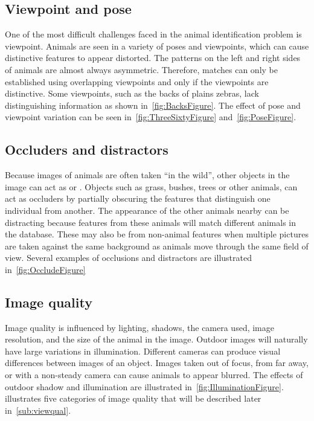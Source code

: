     \subsection{Viewpoint and pose}
        One of the most difficult challenges faced in the animal
          identification problem is viewpoint.
        Animals are seen in a variety of poses and viewpoints, which
          can cause distinctive features to appear distorted.
        The patterns on the left and right sides of animals are almost
          always asymmetric.
        Therefore, matches can only be established using overlapping
          viewpoints and only if the viewpoints are distinctive.
        Some viewpoints, such as the backs of plains zebras, lack
          distinguishing information as shown in~\cref{fig:BacksFigure}.
        The effect of pose and viewpoint variation can be seen
          in~\cref{fig:ThreeSixtyFigure} and~\cref{fig:PoseFigure}.

        \BacksFigure{}

        \ThreeSixtyFigure{}

        \PoseFigure{}

    \subsection{Occluders and distractors}
        Because images of animals are often taken ``in the wild'',
          other objects in the image can act as  or
          .
        Objects such as grass, bushes, trees or other animals, can act
          as occluders by partially obscuring the features that
          distinguish one individual from another.
        The appearance of the other animals nearby can be distracting
          because features from these animals will match different
          animals in the database.
        These  may also be from non-animal
          features when multiple pictures are taken against the same
          background as animals move through the same field of view.
        Several examples of occlusions and distractors are illustrated
          in~\cref{fig:OccludeFigure}

        \OccludeFigure{}

    \subsection{Image quality}
        Image quality is influenced by lighting, shadows, the camera
          used, image resolution, and the size of the animal in the
          image.
        Outdoor images will naturally have large variations in
          illumination.
        Different cameras can produce visual differences between images
          of an object.
        Images taken out of focus, from far away, or with a non-steady
          camera can cause animals to appear blurred.
        The effects of outdoor shadow and illumination are illustrated
          in~\cref{fig:IlluminationFigure}.
         illustrates five categories of image
          quality that will be described later in~\cref{sub:viewqual}.

